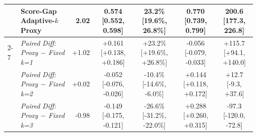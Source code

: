 \begin{table}[t]
\begin{tabular}{llrcccc}
 & \textbf{Score-Gap Adaptive-$k$ Proxy} & 2.02 & 0.574 [0.552, 0.598] & 23.2\% [19.6\%, 26.8\%] & 0.770 [0.739, 0.799] & 200.6 [177.3, 226.8] \\
\cmidrule(lr){2-7}
 & \textit{Paired Diff: Proxy $-$ Fixed k=1} & +1.02 & +0.161 [+0.138, +0.186] & +23.2\% [+19.6\%, +26.8\%] & -0.056 [-0.079, -0.033] & +115.7 [+94.1, +140.0] \\
 & \textit{Paired Diff: Proxy $-$ Fixed k=2} & +0.02 & -0.052 [-0.076, -0.026] & -10.4\% [-14.6\%, -6.0\%] & +0.144 [+0.118, +0.172] & +12.7 [-9.3, +37.6] \\
 & \textit{Paired Diff: Proxy $-$ Fixed k=3} & -0.98 & -0.149 [-0.175, -0.121] & -26.6\% [-31.2\%, -22.0\%] & +0.288 [+0.260, +0.315] & -97.3 [-120.0, -72.8] \\
\bottomrule
\end{tabular}
\end{table}
